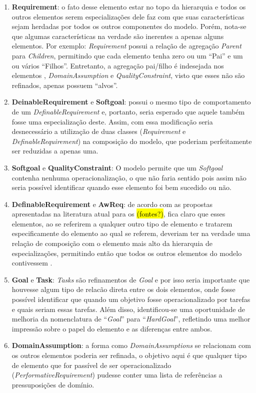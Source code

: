 \begin{enumerate}
	\item \textbf{Requirement}: o fato desse elemento estar no topo da hierarquia e todos os outros elementos serem especializações dele faz com que suas características sejam herdadas por todos os outros componentes do modelo. Porém, nota-se que algumas características na verdade são inerentes a apenas alguns elementos. Por exemplo: \textit{Requirement} possui a relação de agregação \textit{Parent} para \textit{Children}, permitindo que cada elemento tenha zero ou um ``Pai'' e um ou vários ``Filhos''. Entretanto, a agregação pai/filho é indesejada nos elementos \awreq, \textit{DomainAssumption} e \textit{QualityConstraint}, visto que esses não são refinados, apenas possuem ``alvos''. \label{p1}
	
	\item \textbf{DeinableRequirement} e \textbf{Softgoal}: \sofgoal possui o mesmo tipo de comportamento de um \textit{DefinableRequirement} e, portanto, seria esperado que aquele também fosse uma especialização deste. Assim, com essa modificação seria desnecessário a utilização de duas classes (\textit{Requirement} e \textit{DefinableRequirement}) na composição do modelo, que poderiam perfeitamente ser reduzidas a apenas uma. \label{p2}
	
	\item \textbf{Softgoal} e \textbf{QualityConstraint}: O modelo permite que um \textit{Softgoal} contenha nenhuma operacionalização, o que não faria sentido pois assim não seria possível identificar quando esse elemento foi bem sucedido ou não. \label{p3}
	
	\item \textbf{DefinableRequirement} e \textbf{AwReq}: de acordo com as propostas apresentadas na literatura atual para os \awreqs \hl{(fontes?)}, fica claro que esses elementos, ao se referirem a qualquer outro tipo de elemento e tratarem especificamente do elemento ao qual se referem, deveriam ter na verdade uma relação de composição com o elemento mais alto da hierarquia de especializações, permitindo então que todos os outros elementos do modelo contivessem \awreqs. \label{p4}
	
	\item \textbf{Goal} e \textbf{Task}: \textit{Tasks} são refinamentos de \textit{Goal} e por isso seria importante que houvesse algum tipo de relacão direta entre os dois elementos, onde fosse possível identificar que quando um objetivo fosse operacionalizado por tarefas e quais seriam essas tarefas. Além disso, identificou-se uma oportunidade de melhoria da nomenclatura de ``\textit{Goal}'' para ``\textit{HardGoal}'', refletindo uma melhor impressão sobre o papel do elemento e as diferenças entre ambos. \label{p5}
	
	\item \textbf{DomainAssumption}: a forma como \textit{DomainAssumptions} se relacionam com os outros elementos poderia ser refinada, o objetivo aqui é que qualquer tipo de elemento que for passível de ser operacionalizado (\textit{PerformativeRequirement}) pudesse conter uma lista de referências a pressuposições de domínio. \label{p6}
\end{enumerate}

